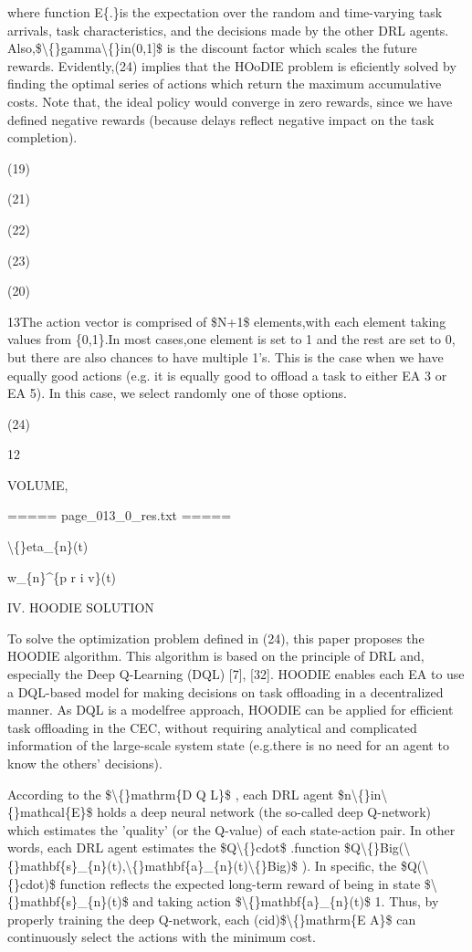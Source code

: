 \documentclass{article}
\begin{document}
where function E\{.\}is the expectation over the random and time-varying task arrivals, task characteristics, and the decisions made by the other DRL agents. Also,\$\textbackslash\{\}gamma\textbackslash\{\}in(0,1]\$ is the discount factor which scales the future rewards. Evidently,(24) implies that the HOoDIE problem is eficiently solved by finding the optimal series of actions which return the maximum accumulative costs. Note that, the ideal policy would converge in zero rewards, since we have defined negative rewards (because delays reflect negative impact on the task completion).

(19)

(21)

(22)

(23)

(20)

13The action vector is comprised of \$N+1\$ elements,with each element taking values from \{0,1\}.In most cases,one element is set to 1 and the rest are set to 0, but there are also chances to have multiple 1's. This is the case when we have equally good actions (e.g. it is equally good to offload a task to either EA 3 or EA 5). In this case, we select randomly one of those options.

(24)

12

VOLUME,

===== page\_013\_0\_res.txt =====


\textbackslash\{\}eta\_\{n\}(t)

w\_\{n\}\textasciicircum{}\{p r i v\}(t)

IV. HOODIE SOLUTION

To solve the optimization problem defined in (24), this paper proposes the HOODIE algorithm. This algorithm is based on the principle of DRL and, especially the Deep Q-Learning (DQL) [7], [32]. HOODIE enables each EA to use a DQL-based model for making decisions on task offloading in a decentralized manner. As DQL is a modelfree approach, HOODIE can be applied for efficient task offloading in the CEC, without requiring analytical and complicated information of the large-scale system state (e.g.there is no need for an agent to know the others' decisions).

According to the \$\textbackslash\{\}mathrm\{D Q L\}\$ , each DRL agent \$n\textbackslash\{\}in\textbackslash\{\}mathcal\{E\}\$ holds a deep neural network (the so-called deep Q-network) which estimates the 'quality' (or the Q-value) of each state-action pair. In other words, each DRL agent estimates the \$Q\textbackslash\{\}cdot\$ .function \$Q\textbackslash\{\}Big(\textbackslash\{\}mathbf\{s\}\_\{n\}(t),\textbackslash\{\}mathbf\{a\}\_\{n\}(t)\textbackslash\{\}Big)\$ ). In specific, the \$Q(\textbackslash\{\}cdot)\$ function reflects the expected long-term reward of being in state \$\textbackslash\{\}mathbf\{s\}\_\{n\}(t)\$ and taking action \$\textbackslash\{\}mathbf\{a\}\_\{n\}(t)\$ 1. Thus, by properly training the deep Q-network, each (cid)\$\textbackslash\{\}mathrm\{E A\}\$ can continuously select the actions with the minimum cost.
\end{document}
